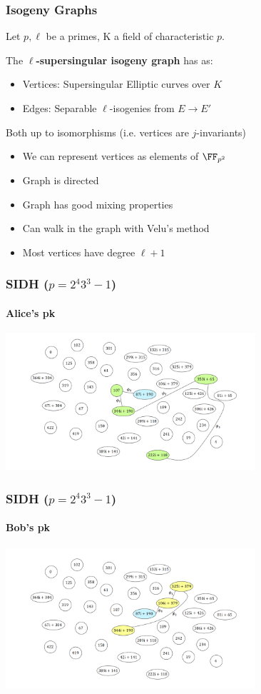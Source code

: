 \documentclass{beamer}
\begin{document}
\begin{frame}
    \frametitle{Isogeny Graphs}
    Let $p, \ell$ be a primes, K a field of characteristic $p$. 
    
    \begin{definition}
        The $\ell$\textbf{-supersingular isogeny graph} has as:
        \begin{itemize}
            \item Vertices: Supersingular Elliptic curves over $K$
            \item Edges: Separable $\ell$-isogenies from $E \to E'$
        \end{itemize}

        Both up to isomorphisms (i.e. vertices are $j$-invariants)
    \end{definition}
    \begin{itemize}
        \item We can represent vertices as elements of $\FF_{p^2}$
        \item Graph is directed
        \item Graph has good mixing properties
        \item Can walk in the graph with Velu's method
        \item Most vertices have degree $\ell + 1$
    \end{itemize} 

\end{frame}

\begin{frame}
    \frametitle{SIDH ($p = 2^4 3^3 - 1$)}
    \framesubtitle{Alice's pk}
    \begin{center}
        \includegraphics[width=25em]{alice_pk.PNG}
    \end{center}
\end{frame}

\begin{frame}
    \frametitle{SIDH ($p = 2^4 3^3 - 1$)}
    \framesubtitle{Bob's pk}
    \begin{center}
        \includegraphics[width=25em]{bob_pk.PNG}
    \end{center}
\end{frame}
\end{document}
